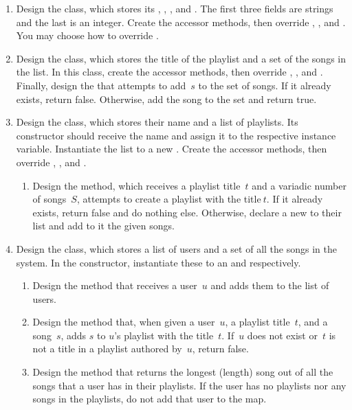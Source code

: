 \newpage %
\begin{enumerate}[label=(\alph*)]
  \item Design the  class, which stores its , , , and . The first three fields are strings and the last is an integer. Create the accessor methods, then override , , and . You may choose how to override .
  \item Design the  class, which stores the title of the playlist and a set of the songs in the list. In this class, create the accessor methods, then override , , and . Finally, design the  that attempts to add~$s$ to the set of songs. If it already exists, return false. Otherwise, add the song to the set and return true.
  \item Design the  class, which stores their name and a list of playlists. Its constructor should receive the name and assign it to the respective instance variable. Instantiate the list to a new . Create the accessor methods, then override , , and .
  \begin{enumerate}[label=(\roman*)]
    \item Design the  method, which receives a playlist title~$t$ and a variadic number of songs~$S$, attempts to create a playlist with the title$~t$. If it already exists, return false and do nothing else. Otherwise, declare a new  to their list and add to it the given songs.
  \end{enumerate}
  \item Design the  class, which stores a list of users and a set of all the songs in the system. In the constructor, instantiate these to an  and  respectively.
  \begin{enumerate}[label=(\roman*)]
    \item Design the  method that receives a user~$u$ and adds them to the list of users.
    \item Design the  method that, when given a user~$u$, a playlist title~$t$, and a song~$s$, adds $s$ to $u$'s playlist with the title~$t$. If~$u$ does not exist or~$t$ is not a title in a playlist authored by~$u$, return false.
    \item Design the  method that returns the longest (length) song out of all the songs that a user has in their playlists. If the user has no playlists nor any songs in the playlists, do not add that user to the map.
  \end{enumerate}
\end{enumerate}

